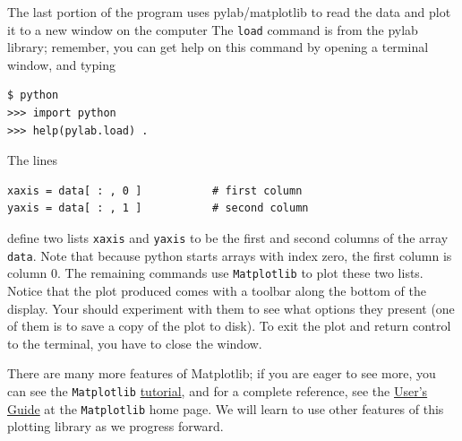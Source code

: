 The last portion of the program uses pylab/matplotlib to read the data and plot it to a new window on the computer The \verb!load! command is from the pylab library; remember, you can get help on this command by opening a terminal window, and typing 
\begin{verbatim}
$ python
>>> import python
>>> help(pylab.load) .
\end{verbatim}
The lines
\begin{lstlisting}[frame=none]
xaxis = data[ : , 0 ]			# first column
yaxis = data[ : , 1 ]			# second column
\end{lstlisting}
define two lists \verb!xaxis! and \verb!yaxis! to be the first and second columns of the array \verb!data!. Note that because python starts arrays with index zero, the first column is column 0. The remaining commands use \verb!Matplotlib! to plot these two lists. Notice that the plot produced comes with a toolbar along the bottom of the display. Your should experiment with them to see what options they present (one of them is to save a copy of the plot to disk). To exit the plot and return control to the terminal, you have to close the window. 

There are many more features of Matplotlib; if you are eager to see more, you can see the \verb!Matplotlib! \href{http://matplotlib.sourceforge.net/tutorial.html}{tutorial}, and for a complete reference, see the \href{http://matplotlib.sourceforge.net/}{User's Guide} at the \verb!Matplotlib! home page. We will learn to use other features of this plotting library as we progress forward. 

